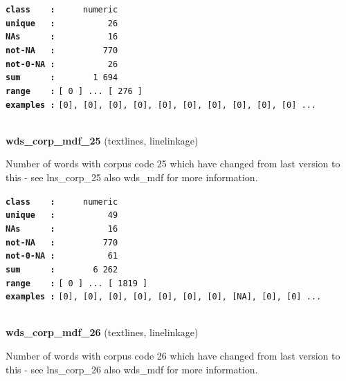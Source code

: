 \documentclass[]{article}
\begin{document}
\textbf{\texttt{class\ \ \ \ :}} \texttt{~~~~~numeric}\\
\textbf{\texttt{unique\ \ \ :}} \texttt{~~~~~~~~~~26}\\
\textbf{\texttt{NAs\ \ \ \ \ \ :}} \texttt{~~~~~~~~~~16}\\
\textbf{\texttt{not-NA\ \ \ :}} \texttt{~~~~~~~~~770}\\
\textbf{\texttt{not-0-NA\ :}} \texttt{~~~~~~~~~~26}\\
\textbf{\texttt{sum\ \ \ \ \ \ :}} \texttt{~~~~~~~1~694}\\
\textbf{\texttt{range\ \ \ \ :}}
\texttt{{[}\ 0\ {]}\ ...\ {[}\ 276\ {]}}\\
\textbf{\texttt{examples\ :}}
\texttt{{[}0{]},\ {[}0{]},\ {[}0{]},\ {[}0{]},\ {[}0{]},\ {[}0{]},\ {[}0{]},\ {[}0{]},\ {[}0{]},\ {[}0{]}\ ...}\\

~

\textbf{wds\_corp\_mdf\_25} (textlines, linelinkage)

Number of words with corpus code 25 which have changed from last version
to this - see lns\_corp\_25 also wds\_mdf for more information.

\textbf{\texttt{class\ \ \ \ :}} \texttt{~~~~~numeric}\\
\textbf{\texttt{unique\ \ \ :}} \texttt{~~~~~~~~~~49}\\
\textbf{\texttt{NAs\ \ \ \ \ \ :}} \texttt{~~~~~~~~~~16}\\
\textbf{\texttt{not-NA\ \ \ :}} \texttt{~~~~~~~~~770}\\
\textbf{\texttt{not-0-NA\ :}} \texttt{~~~~~~~~~~61}\\
\textbf{\texttt{sum\ \ \ \ \ \ :}} \texttt{~~~~~~~6~262}\\
\textbf{\texttt{range\ \ \ \ :}}
\texttt{{[}\ 0\ {]}\ ...\ {[}\ 1819\ {]}}\\
\textbf{\texttt{examples\ :}}
\texttt{{[}0{]},\ {[}0{]},\ {[}0{]},\ {[}0{]},\ {[}0{]},\ {[}0{]},\ {[}0{]},\ {[}NA{]},\ {[}0{]},\ {[}0{]}\ ...}\\

~

\textbf{wds\_corp\_mdf\_26} (textlines, linelinkage)

Number of words with corpus code 26 which have changed from last version
to this - see lns\_corp\_26 also wds\_mdf for more information.
\end{document}
